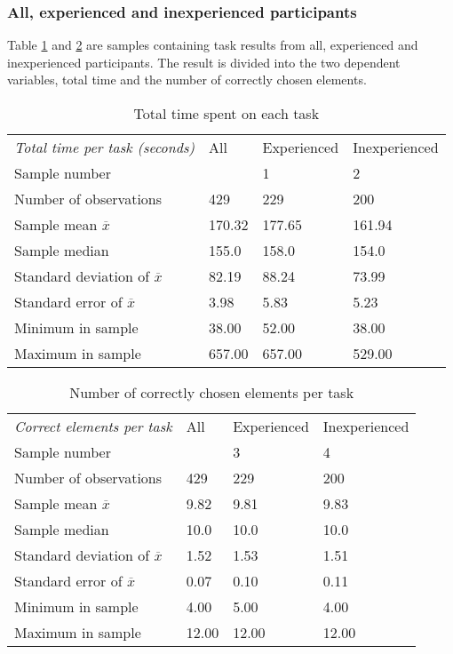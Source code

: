
\subsubsection{All,  experienced and inexperienced participants}\label{sec:alltasks}

Table \ref{tab:totaltime_all} and \ref{tab:totalcorrect_all} are samples containing task results from all, experienced and inexperienced participants. The result is divided into the two dependent variables, total time and the number of correctly chosen elements.

\begin{table}[H]
	\centering
	\begin{tabular}{l|l|l|l}
		\textit{Total time per task (seconds) } & All  & Experienced & Inexperienced \\ 
		Sample number &   & 1  & 2   \\ \hline
		Number of observations & 429    & 229    & 200   \\
		Sample mean $\overline{x}$     & 170.32 & 177.65  & 161.94     \\
		Sample median  & 155.0 & 158.0  & 154.0  \\
		Standard deviation of $\overline{x}$  & 82.19  & 88.24  & 73.99   \\
		Standard error of $\overline{x}$  & 3.98  & 5.83 & 5.23  \\
		Minimum in sample & 38.00  & 52.00  & 38.00     \\
		Maximum in sample & 657.00 & 657.00  & 529.00    \\ \hline
	\end{tabular}
	\caption[Total time, all participants]{Total time spent on each task}
	\label{tab:totaltime_all}
\end{table}

\begin{table}[H]
	\centering
	\begin{tabular}{l|l|l|l}
		\textit{Correct elements per task } & All  & Experienced & Inexperienced \\ 
		Sample number &   & 3  & 4   \\ \hline
		Number of observations & 429    & 229  & 200   \\
		Sample mean $\overline{x}$   & 9.82 & 9.81  & 9.83  \\
		Sample median & 10.0 & 10.0 & 10.0 \\
		Standard deviation of $\overline{x}$   & 1.52  & 1.53  &  1.51 \\
		Standard error of $\overline{x}$   & 0.07  & 0.10 &  0.11 \\
		Minimum in sample & 4.00 & 5.00  &  4.00  \\
		Maximum in sample  & 12.00 & 12.00  & 12.00  \\ \hline
	\end{tabular}
	\caption[Correct elements, all participants]{Number of correctly chosen elements per task}
	\label{tab:totalcorrect_all}
\end{table}

